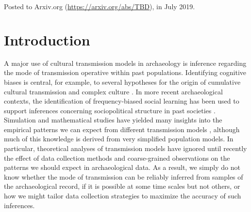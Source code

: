 \begin{description}[leftmargin=-1\labelwidth]
\item[\textsc{Abstract}] \lipsum[1] 

\item[\textsc{Source}]  Posted to Arxiv.org (\url{https://arxiv.org/abs/TBD}), in July 2019.  
\end{description}


\section{Introduction}\label{introduction}

A major use of cultural transmission models in archaeology is inference
regarding the mode of transmission operative within past populations.
Identifying cognitive biases is central, for example, to several
hypotheses for the origin of cumulative cultural transmission and
complex culture \cite{BR1985, CF1981, Henrich:1998ek, Wakano:2007gq}.
In more recent archaeological contexts, the identification of
frequency-biased social learning has been used to support
inferences concerning sociopolitical structure 
in past societies \cite{kohler2004}.  Simulation and mathematical
studies have yielded many insights into the empirical patterns we can expect from different transmission models
\cite{Bentley2003, bentley2007regular, bentley2004random, Evans:2011vm, Mesoudi2009},
although much of this knowledge is derived from very simplified
population models.  In particular, theoretical analyses of transmission models  have ignored until recently the effect of data collection methods and coarse-grained observations on the patterns we should expect in archaeological data.  As a result, we simply do not know whether the mode of transmission can be reliably inferred from samples of the archaeological record, if it is possible at some time scales but not others, or how we might tailor data collection strategies to maximize the accuracy of such inferences.


